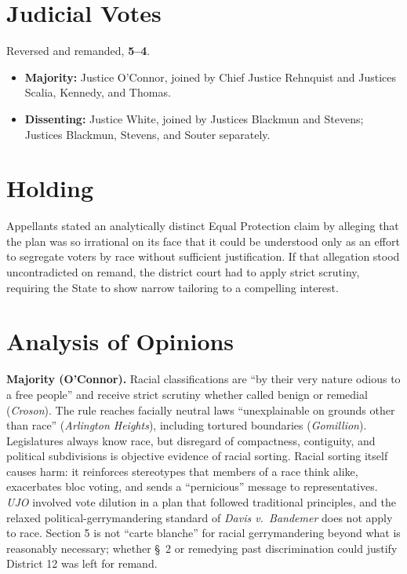 \documentclass[12pt]{article}
\begin{document}
\section{Judicial Votes}

Reversed and remanded, \textbf{5--4}.
\begin{itemize}
\item \textbf{Majority:} Justice O'Connor, joined by Chief Justice Rehnquist and Justices Scalia, Kennedy, and Thomas.
\item \textbf{Dissenting:} Justice White, joined by Justices Blackmun and Stevens; Justices Blackmun, Stevens, and Souter separately.
\end{itemize}

\section{Holding}

Appellants stated an analytically distinct Equal Protection claim by alleging that the plan was so irrational on its face that it could be understood only as an effort to segregate voters by race without sufficient justification. If that allegation stood uncontradicted on remand, the district court had to apply strict scrutiny, requiring the State to show narrow tailoring to a compelling interest.

\section{Analysis of Opinions}

\textbf{Majority (O'Connor).} Racial classifications are ``by their very nature odious to a free people'' and receive strict scrutiny whether called benign or remedial (\textit{Croson}). The rule reaches facially neutral laws ``unexplainable on grounds other than race'' (\textit{Arlington Heights}), including tortured boundaries (\textit{Gomillion}). Legislatures always know race, but disregard of compactness, contiguity, and political subdivisions is objective evidence of racial sorting. Racial sorting itself causes harm: it reinforces stereotypes that members of a race think alike, exacerbates bloc voting, and sends a ``pernicious'' message to representatives. \textit{UJO} involved vote dilution in a plan that followed traditional principles, and the relaxed political-gerrymandering standard of \textit{Davis v.\ Bandemer} does not apply to race. Section 5 is not ``carte blanche'' for racial gerrymandering beyond what is reasonably necessary; whether \S\ 2 or remedying past discrimination could justify District 12 was left for remand.
\end{document}
